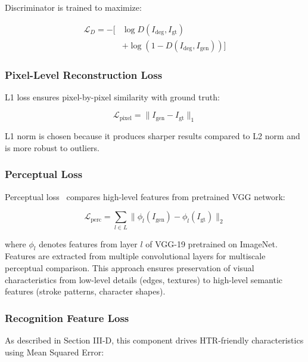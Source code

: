 \documentclass[journal]{IEEEtran}
\begin{document}
Discriminator is trained to maximize:

\begin{equation}
\begin{split}
\mathcal{L}_D = -[&\log D(I_{\text{deg}}, I_{\text{gt}}) \\
&+ \log(1 - D(I_{\text{deg}}, I_{\text{gen}}))]
\end{split}
\end{equation}

\subsubsection{Pixel-Level Reconstruction Loss}

L1 loss ensures pixel-by-pixel similarity with ground truth:

\begin{equation}
\mathcal{L}_{\text{pixel}} = \|I_{\text{gen}} - I_{\text{gt}}\|_1
\end{equation}

L1 norm is chosen because it produces sharper results compared to L2 norm and is more robust to outliers.

\subsubsection{Perceptual Loss}

Perceptual loss~\cite{johnson2016perceptual} compares high-level features from pretrained VGG network:

\begin{equation}
\mathcal{L}_{\text{perc}} = \sum_{l \in L} \|\phi_l(I_{\text{gen}}) - \phi_l(I_{\text{gt}})\|_2
\end{equation}

where $\phi_l$ denotes features from layer $l$ of VGG-19 pretrained on ImageNet. Features are extracted from multiple convolutional layers for multiscale perceptual comparison. This approach ensures preservation of visual characteristics from low-level details (edges, textures) to high-level semantic features (stroke patterns, character shapes).

\subsubsection{Recognition Feature Loss}

As described in Section III-D, this component drives HTR-friendly characteristics using Mean Squared Error:
\end{document}
